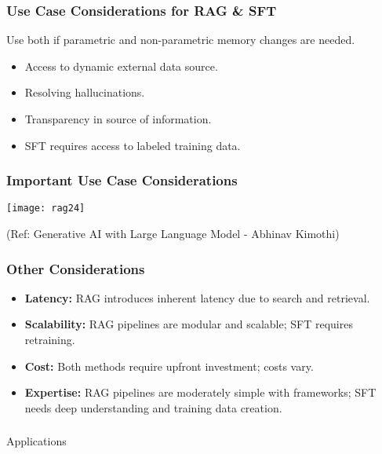 \begin{frame}[fragile]\frametitle{Use Case Considerations for RAG \& SFT}
Use both if parametric and non-parametric memory changes are needed.

\begin{itemize}
  \item Access to dynamic external data source.
  \item Resolving hallucinations.
  \item Transparency in source of information.
  \item SFT requires access to labeled training data.
\end{itemize}
\end{frame}

\begin{frame}[fragile]\frametitle{Important Use Case Considerations}


		\begin{center}
		\texttt{[image: rag24]}
		\end{center}

{\tiny (Ref: Generative AI with Large Language Model - Abhinav  Kimothi)}

\end{frame}

\begin{frame}[fragile]\frametitle{Other Considerations}
\begin{itemize}
  \item \textbf{Latency:} RAG introduces inherent latency due to search and retrieval.
  \item \textbf{Scalability:} RAG pipelines are modular and scalable; SFT requires retraining.
  \item \textbf{Cost:} Both methods require upfront investment; costs vary.
  \item \textbf{Expertise:} RAG pipelines are moderately simple with frameworks; SFT needs deep understanding and training data creation.
\end{itemize}
\end{frame}


\begin{frame}[fragile]\frametitle{}
\begin{center}
{\Large Applications}
\end{center}
\end{frame}


